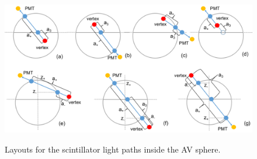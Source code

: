 \begin{figure}
	\centering
	{\includegraphics[width=130mm]{scintPathAV.png}}
	\caption{Layouts for the scintillator light paths inside the AV sphere.\label{lightpath_scintAV}}
\end{figure}

